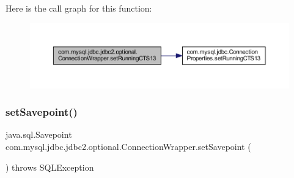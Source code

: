 Here is the call graph for this function\+:
\nopagebreak
\begin{figure}[H]
\begin{center}
\leavevmode
\includegraphics[width=350pt]{classcom_1_1mysql_1_1jdbc_1_1jdbc2_1_1optional_1_1_connection_wrapper_a7a84fadba26631fe6770c399ab0a5e8a_cgraph}
\end{center}
\end{figure}
\mbox{\label{classcom_1_1mysql_1_1jdbc_1_1jdbc2_1_1optional_1_1_connection_wrapper_a6b97c71da72c7bb460e420e03078cb53}} 
\subsubsection{\texorpdfstring{set\+Savepoint()}{setSavepoint()}\hspace{0.1cm}{\footnotesize\ttfamily [1/2]}}
{\footnotesize\ttfamily java.\+sql.\+Savepoint com.\+mysql.\+jdbc.\+jdbc2.\+optional.\+Connection\+Wrapper.\+set\+Savepoint (\begin{DoxyParamCaption}{ }\end{DoxyParamCaption}) throws S\+Q\+L\+Exception}

